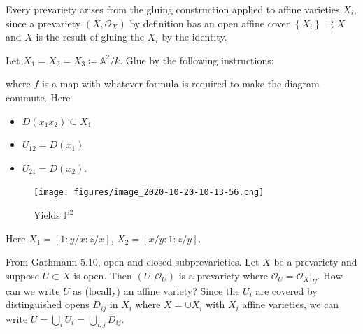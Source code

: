 Every prevariety arises from the gluing construction applied to affine
varieties \(X_i\), since a prevariety \((X, {\mathcal{O}}_X)\) by
definition has an open affine cover
\(\left\{{X_i}\right\} \rightrightarrows X\) and \(X\) is the result of
gluing the \(X_i\) by the identity.

\begin{example}

Let \(X_1 = X_2 = X_3 \coloneqq{\mathbb{A}}^2/k\). Glue by the following
instructions:

\begin{center}
\end{center}

where \(f\) is a map with whatever formula is required to make the
diagram commute. Here

\begin{itemize}
\tightlist
\item
  \(D(x_1 x_2) \subseteq X_1\)
\item
  \(U_{12} = D(x_1)\)
\item
  \(U_{21} = D(x_2)\).
\end{itemize}

\begin{figure}
\centering
\texttt{[image: figures/image\_2020-10-20-10-13-56.png]}
\caption{Yields \({\mathbb{P}}^2\)}
\end{figure}

Here \(X_1 = [1: y/x: z/x]\), \(X_2 = [x/y: 1: z/y]\).

\end{example}

\begin{example}

From Gathmann 5.10, open and closed subprevarieties. Let \(X\) be a
prevariety and suppose \(U\subset X\) is open. Then
\((U, {\mathcal{O}}_U)\) is a prevariety where
\({\mathcal{O}}_U = { \left.{{{\mathcal{O}}_X}} \right|_{{U}} }\). How
can we write \(U\) as (locally) an affine variety? Since the \(U_i\) are
covered by distinguished opens \(D_{ij}\) in \(X_i\) where
\(X = \cup X_i\) with \(X_i\) affine varieties, we can write
\(U = \bigcup_i U_i = \bigcup_{i, j} D_{ij}\).

\end{example}

